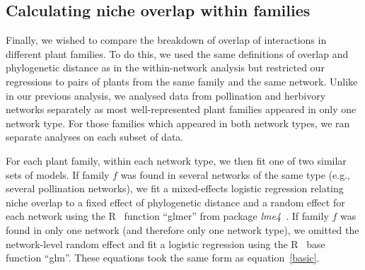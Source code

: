 \documentclass[12pt]{article}
\begin{document}
\begin{spacing}{1.5}


  \subsection*{Calculating niche overlap within families}


    Finally, we wished to compare the breakdown of overlap of interactions in
    different plant families. To do this, we used the same definitions of 
    overlap and phylogenetic distance as in the within-network analysis but 
    restricted our regressions to pairs of plants from the same family and 
    the same network. Unlike in our previous analysis, we analysed data from 
    pollination and herbivory networks separately as most well-represented 
    plant families appeared in only one network type. For those families 
    which appeared in both network types, we ran separate analyses on each 
    subset of data.


    For each plant family, within each network type, we then fit one of two 
    similar sets of models. If family $f$ was found in several networks of 
    the same type (e.g., several pollination networks), we fit a 
    mixed-effects logistic regression relating niche overlap to a fixed 
    effect of phylogenetic distance and a random effect for each network 
    using the R~\citep{R} function ``glmer'' from package
     \emph{lme4}~\citep{lme4}. If family $f$ was found in only one network
    (and therefore only one network type), we omitted the 
    network-level random effect and fit a logistic regression using the 
    R~\citep{R} base function ``glm''. These equations took the same form as equation~\ref{basic}.



\end{spacing}
\end{document}
